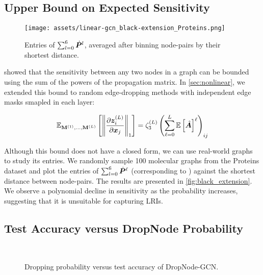 \subsection{Upper Bound on Expected Sensitivity}

\begin{figure}
    \centering
    \texttt{[image: assets/linear-gcn\_black-extension\_Proteins.png]}
    \caption{Entries of $\sum_{l=0}^6 \dot{\bm{P}}^l$, averaged after binning node-pairs by their shortest distance.}
    \label{fig:black_extension}
\end{figure}

\citet{black2023resistance} showed that the sensitivity between any two nodes in a graph can be bounded using the sum of the powers of the propagation matrix. In \autoref{sec:nonlinear}, we extended this bound to random edge-dropping methods with independent edge masks smapled in each layer:

\begin{align*}
    \mathbb{E}_{\mathbf{M}^{\left(1\right)}, \ldots, \mathbf{M}^{\left(L\right)}} \left[\left\|\frac{\partial \bm{z}^{\left(L\right)}_i}{\partial \bm{x}_j}\right\|_1\right]
    =
    \zeta_3^{\left(L\right)} \left(\sum_{\ell=0}^L \mathbb{E} \left[\hat{\bm{A}}\right]^{\ell}\right)_{ij}
\end{align*}

Although this bound does not have a closed form, we can use real-world graphs to study its entries. We randomly sample 100 molecular graphs from the Proteins dataset \cite{dobson2003proteins} and plot the entries of $\sum_{l=0}^6 \dot{\bm{P}}^\ell$ (corresponding to ) against the shortest distance between node-pairs. The results are presented in \autoref{fig:black_extension}. We observe a polynomial decline in sensitivity as the  probability increases, suggesting that it is unsuitable for capturing LRIs.

\subsection{Test Accuracy versus DropNode Probability}

\begin{figure}[t]
    \centering
     \\
    \vspace{2mm}
    \caption{Dropping probability versus test accuracy of DropNode-GCN.}
    \label{fig:dropnode}
\end{figure}

